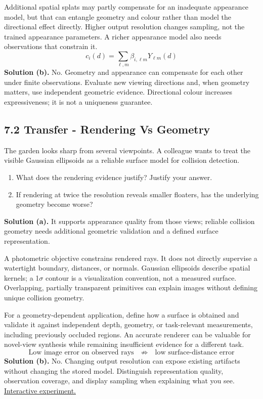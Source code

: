 \documentclass[11pt,a4paper]{article}
\begin{document}
Additional spatial splats may partly compensate for an inadequate appearance model, but that can entangle geometry and colour rather than model the directional effect directly.
Higher output resolution changes sampling, not the trained appearance parameters.
A richer appearance model also needs observations that constrain it.
\[
c_i(d)=\sum_{\ell,m}\beta_{i,\ell m}Y_{\ell m}(d)
\]
\noindent\textbf{Solution (b).} No.
Geometry and appearance can compensate for each other under finite observations.
Evaluate new viewing directions and, when geometry matters, use independent geometric evidence.
Directional colour increases expressiveness; it is not a uniqueness guarantee.
\subsection*{7.2 Transfer - Rendering Vs Geometry}
The garden looks sharp from several viewpoints.
A colleague wants to treat the visible Gaussian ellipsoids as a reliable surface model for collision detection.
\begin{enumerate}[label=(\alph*),nosep]
\item What does the rendering evidence justify?
Justify your answer.
\item If rendering at twice the resolution reveals smaller floaters, has the underlying geometry become worse?
\end{enumerate}
\noindent\textbf{Solution (a).} It supports appearance quality from those views; reliable collision geometry needs additional geometric validation and a defined surface representation.

A photometric objective constrains rendered rays.
It does not directly supervise a watertight boundary, distances, or normals.
Gaussian ellipsoids describe spatial kernels; a 1$\sigma$ contour is a visualization convention, not a measured surface.
Overlapping, partially transparent primitives can explain images without defining unique collision geometry.

For a geometry-dependent application, define how a surface is obtained and validate it against independent depth, geometry, or task-relevant measurements, including previously occluded regions.
An accurate renderer can be valuable for novel-view synthesis while remaining insufficient evidence for a different task.
\[
\text{Low image error on observed rays}\quad\not\Rightarrow\quad\text{low surface-distance error}
\]
\noindent\textbf{Solution (b).} No.
Changing output resolution can expose existing artifacts without changing the stored model.
Distinguish representation quality, observation coverage, and display sampling when explaining what you see.
\noindent\href{https://sosekie.github.io/Unibe-CVG-CV-Interactive-Labs/tutorial-09/#highres}{Interactive experiment.}
\end{document}
